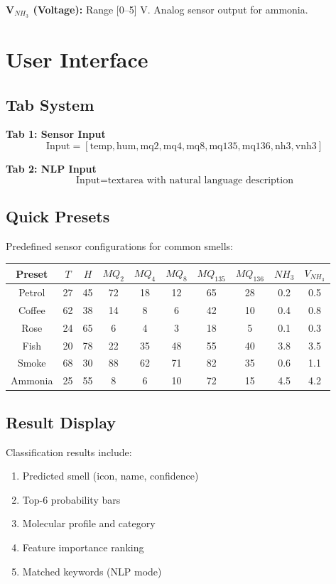 \documentclass[10pt]{article}
\begin{document}
\textbf{V$_{NH_3}$ (Voltage):} Range [0–5] V. Analog sensor output for ammonia.

\section{User Interface}

\subsection{Tab System}

\textbf{Tab 1: Sensor Input}
\[
\text{Input} = [\text{temp}, \text{hum}, \text{mq2}, \text{mq4}, \text{mq8}, \text{mq135}, \text{mq136}, \text{nh3}, \text{vnh3}]
\]

\textbf{Tab 2: NLP Input}
\[
\text{Input} = \text{textarea with natural language description}
\]

\subsection{Quick Presets}

Predefined sensor configurations for common smells:

\begin{table}[H]
\centering
\small
\begin{tabular}{|c|ccccccccc|}
\hline
\textbf{Preset} & $T$ & $H$ & $MQ_2$ & $MQ_4$ & $MQ_8$ & $MQ_{135}$ & $MQ_{136}$ & $NH_3$ & $V_{NH_3}$ \\
\hline
Petrol & 27 & 45 & 72 & 18 & 12 & 65 & 28 & 0.2 & 0.5 \\
Coffee & 62 & 38 & 14 & 8 & 6 & 42 & 10 & 0.4 & 0.8 \\
Rose & 24 & 65 & 6 & 4 & 3 & 18 & 5 & 0.1 & 0.3 \\
Fish & 20 & 78 & 22 & 35 & 48 & 55 & 40 & 3.8 & 3.5 \\
Smoke & 68 & 30 & 88 & 62 & 71 & 82 & 35 & 0.6 & 1.1 \\
Ammonia & 25 & 55 & 8 & 6 & 10 & 72 & 15 & 4.5 & 4.2 \\
\hline
\end{tabular}
\end{table}

\subsection{Result Display}

Classification results include:
\begin{enumerate}
    \item Predicted smell (icon, name, confidence)
    \item Top-6 probability bars
    \item Molecular profile and category
    \item Feature importance ranking
    \item Matched keywords (NLP mode)
\end{enumerate}
\end{document}
